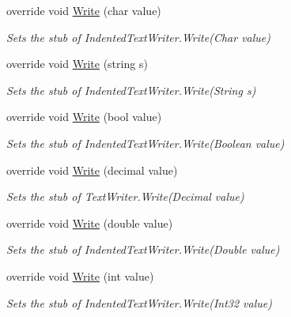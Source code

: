 \begin{DoxyCompactItemize}
override void \hyperlink{class_system_1_1_code_dom_1_1_compiler_1_1_fakes_1_1_stub_indented_text_writer_a03bb1e5a2980eac5461ef7094a5d11bf}{Write} (char value)
\begin{DoxyCompactList}\small\item\em Sets the stub of Indented\-Text\-Writer.\-Write(\-Char value)\end{DoxyCompactList}\item 
override void \hyperlink{class_system_1_1_code_dom_1_1_compiler_1_1_fakes_1_1_stub_indented_text_writer_a521851848c401fad14f801f7244267ce}{Write} (string s)
\begin{DoxyCompactList}\small\item\em Sets the stub of Indented\-Text\-Writer.\-Write(\-String s)\end{DoxyCompactList}\item 
override void \hyperlink{class_system_1_1_code_dom_1_1_compiler_1_1_fakes_1_1_stub_indented_text_writer_a4b25a9db7386ab3cf2a2e1a67700c740}{Write} (bool value)
\begin{DoxyCompactList}\small\item\em Sets the stub of Indented\-Text\-Writer.\-Write(\-Boolean value)\end{DoxyCompactList}\item 
override void \hyperlink{class_system_1_1_code_dom_1_1_compiler_1_1_fakes_1_1_stub_indented_text_writer_a0e741708c27ad6740753077a96b189d0}{Write} (decimal value)
\begin{DoxyCompactList}\small\item\em Sets the stub of Text\-Writer.\-Write(\-Decimal value)\end{DoxyCompactList}\item 
override void \hyperlink{class_system_1_1_code_dom_1_1_compiler_1_1_fakes_1_1_stub_indented_text_writer_aa132c62c827a0afdaf9850cea342af1d}{Write} (double value)
\begin{DoxyCompactList}\small\item\em Sets the stub of Indented\-Text\-Writer.\-Write(\-Double value)\end{DoxyCompactList}\item 
override void \hyperlink{class_system_1_1_code_dom_1_1_compiler_1_1_fakes_1_1_stub_indented_text_writer_aa5e4fec4f23c46e5790c4f51d3ca9d97}{Write} (int value)
\begin{DoxyCompactList}\small\item\em Sets the stub of Indented\-Text\-Writer.\-Write(\-Int32 value)\end{DoxyCompactList}\item 

\end{DoxyCompactItemize}
